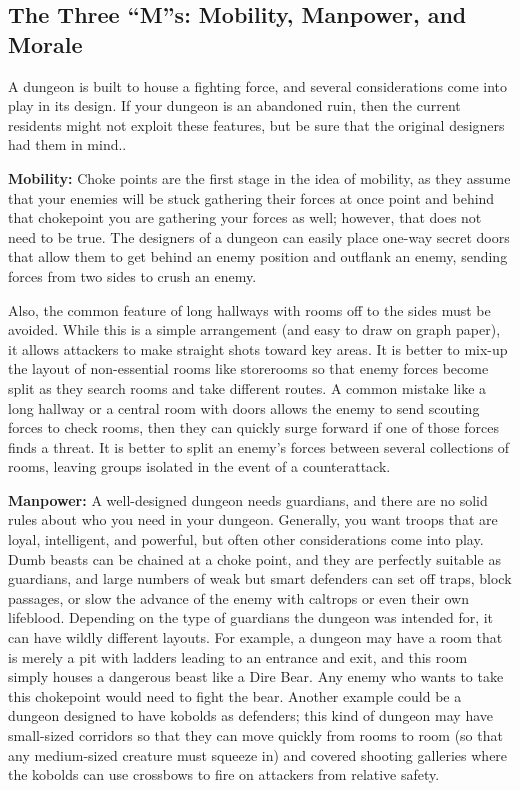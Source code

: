 \subsection{The Three ``M''s: Mobility, Manpower, and Morale}

A dungeon is built to house a fighting force, and several considerations come into play in its design. If your dungeon is an abandoned ruin, then the current residents might not exploit these features, but be sure that the original designers had them in mind..

\textbf{Mobility:} Choke points are the first stage in the idea of mobility, as they assume that your enemies will be stuck gathering their forces at once point and behind that chokepoint you are gathering your forces as well; however, that does not need to be true. The designers of a dungeon can easily place one-way secret doors that allow them to get behind an enemy position and outflank an enemy, sending forces from two sides to crush an enemy.

Also, the common feature of long hallways with rooms off to the sides must be avoided. While this is a simple arrangement (and easy to draw on graph paper), it allows attackers to make straight shots toward key areas. It is better to mix-up the layout of non-essential rooms like storerooms so that enemy forces become split as they search rooms and take different routes. A common mistake like a long hallway or a central room with doors allows the enemy to send scouting forces to check rooms, then they can quickly surge forward if one of those forces finds a threat. It is better to split an enemy's forces between several collections of rooms, leaving groups isolated in the event of a counterattack.

\textbf{Manpower:} A well-designed dungeon needs guardians, and there are no solid rules about who you need in your dungeon. Generally, you want troops that are loyal, intelligent, and powerful, but often other considerations come into play. Dumb beasts can be chained at a choke point, and they are perfectly suitable as guardians, and large numbers of weak but smart defenders can set off traps, block passages, or slow the advance of the enemy with caltrops or even their own lifeblood. Depending on the type of guardians the dungeon was intended for, it can have wildly different layouts. For example, a dungeon may have a room that is merely a pit with ladders leading to an entrance and exit, and this room simply houses a dangerous beast like a Dire Bear. Any enemy who wants to take this chokepoint would need to fight the bear. Another example could be a dungeon designed to have kobolds as defenders; this kind of dungeon may have small-sized corridors so that they can move quickly from rooms to room (so that any medium-sized creature must squeeze in) and covered shooting galleries where the kobolds can use crossbows to fire on attackers from relative safety.

